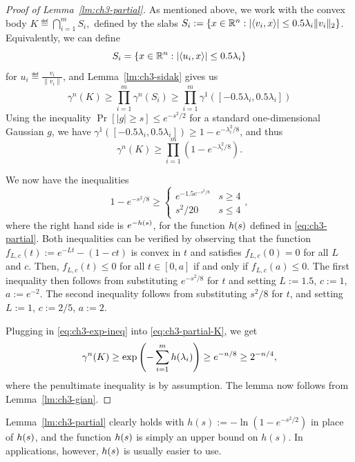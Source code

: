 \begin{proof}[Proof of Lemma~\ref{lm:ch3-partial}]
  As mentioned above, we work with the convex body 
  \(
  K\eqdef \bigcap_{i = 1}^m S_i,
  \)
  defined by the slabs \(S_i := \{x \in \mathbb{R}^n: |\langle v_i,x\rangle| \le
  0.5 \lambda_i\|v_i\|_2 \}\). Equivalently, we can define 
  \[
  S_i = \{x \in \mathbb{R}^n: |\langle u_i,x\rangle| \le 0.5\lambda_i\}
  \]
  for $u_i \eqdef \frac{v_i}{\|v_i\|}$, and
  Lemma~\ref{lm:ch3-sidak} gives us
  \[
    \gamma^n(K) \ge \prod_{i=1}^m\gamma^n(S_i)
    \ge
    \prod_{i=1}^m\gamma^1\left([-0.5\lambda_i, 0.5\lambda_i]\right)
  \]
  Using the inequality \(\Pr[|g| \ge s] \le e^{-s^2/2}\) for a
  standard one-dimensional Gaussian \(g\), we have  $\gamma^1([-0.5\lambda_i, 0.5\lambda_i]) \geq 1-e^{-\lambda_i^2/8}$, and thus
  \begin{equation}
    \label{eq:ch3-partial-K}
    \gamma^n(K) \ge \prod_{i=1}^m(1-e^{-\lambda_i^2/8}).
  \end{equation}

  We now have the inequalities
  \begin{equation}\label{eq:ch3-exp-ineq}
    1-e^{-s^2/8} \ge
    \begin{cases}
      e^{-1.5 e^{-s^2/8}} & s\ge {4}\\
      s^2/20 & s \le {4}
    \end{cases},
  \end{equation}
  where the right hand side is $e^{-h(s)}$, for the function $h(s)$ defined in \eqref{eq:ch3-partial}.
  Both inequalities can be
  verified by observing that the function $f_{L,c}(t) := e^{-Lt} -
  (1-ct)$ is convex in $t$ and satisfies $f_{L,c}(0) = 0$ for all $L$ and
  $c$. Then, $f_{L,c}(t) \le 0$ for all $t \in [0,a]$ if and only if
  $f_{L,c}(a) \le 0$. The first inequality then follows from
  substituting $e^{-s^2/8}$ for $t$ and setting $L := 1.5$, $c := 1$, $a
  := e^{-2}$. The second inequality follows from substituting
  $s^2/8$ for $t$, and setting $L := 1$, $c := 2/5$, $a :=
  2$. 

  Plugging in \eqref{eq:ch3-exp-ineq} into \eqref{eq:ch3-partial-K}, we get
  \[
    \gamma^n(K) \ge \exp\left(-\sum_{i=1}^mh(\lambda_i)\right) \ge
    e^{-n/8} \ge 2^{-n/4},
  \]
  where the penultimate inequality is by assumption. The lemma now
  follows from Lemma~\ref{lm:ch3-gian}.
\end{proof}

\begin{remark}
  Lemma~\ref{lm:ch3-partial} clearly holds with $h(s) :=
  -\ln\left(1-e^{-s^2/2}\right)$ in place of $h(s)$, and the function
  $h(s)$ is simply an upper bound on $h(s)$. In applications, however,
  $h(s)$ is usually easier to use. 
\end{remark}



